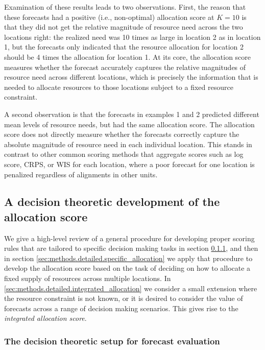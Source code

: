 \documentclass{article}\usepackage[]{graphicx}\usepackage[]{xcolor}
\begin{document}
Examination of these results leads to two observations. First, the reason that these forecasts had a positive (i.e.,
non-optimal) allocation score at $K=10$ is that they did not get the relative magnitude of resource need across the two
locations right: the realized need was 10 times as large in location 2 as in location 1, but the forecasts only
indicated that the resource allocation for location 2 should be 4 times the allocation for location 1. At its core, the
allocation score measures whether the forecast accurately captures the relative magnitudes of resource need across
different locations, which is precisely the information that is needed to allocate resources to those locations subject
to a fixed resource constraint.

A second observation is that the forecasts in examples 1 and 2 predicted different mean levels of resource needs, but
had the same allocation score. The allocation score does not directly measure whether the forecasts correctly capture
the absolute magnitude of resource need in each individual location. This stands in contrast to other common scoring
methods that aggregate scores such as log score, CRPS, or WIS for each location, where a poor forecast for one location
is penalized regardless of alignments in other units.

\subsection{A decision theoretic development of the allocation score}
\label{sec:methods.detailed}

We give a high-level review of a general procedure for developing proper scoring rules that are tailored to specific
decision making tasks in section \ref{sec:methods.detailed.decisiontheory}, and then in section
\ref{sec:methods.detailed.specific_allocation} we apply that procedure to develop the allocation score based on the task
of deciding on how to allocate a fixed supply of resources across multiple locations. In
\ref{sec:methods.detailed.integrated_allocation} we consider a small extension where the resource constraint is not
known, or it is desired to consider the value of forecasts across a range of decision making scenarios. This gives rise
to the \emph{integrated allocation score}.

\subsubsection{The decision theoretic setup for forecast evaluation}
\label{sec:methods.detailed.decisiontheory}
\end{document}
